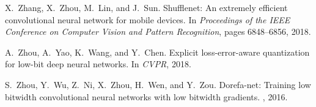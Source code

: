 \documentclass[10pt,twocolumn,letterpaper]{article}
\begin{document}
{\begin{thebibliography}{10}
X.~Zhang, X.~Zhou, M.~Lin, and J.~Sun.
\newblock Shufflenet: An extremely efficient convolutional neural network for
  mobile devices.
\newblock In {\em Proceedings of the IEEE Conference on Computer Vision and
  Pattern Recognition}, pages 6848--6856, 2018.

A.~Zhou, A.~Yao, K.~Wang, and Y.~Chen.
\newblock Explicit loss-error-aware quantization for low-bit deep neural
  networks.
\newblock In {\em CVPR}, 2018.

S.~Zhou, Y.~Wu, Z.~Ni, X.~Zhou, H.~Wen, and Y.~Zou.
\newblock Dorefa-net: Training low bitwidth convolutional neural networks with
  low bitwidth gradients.
, 2016.

\end{thebibliography}
 
}
\end{document}
